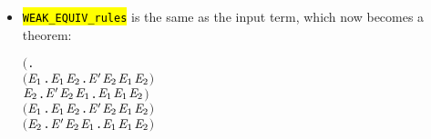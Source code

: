 \begin{itemize}
\item \hl{\texttt{WEAK_EQUIV_rules}} is the same as the input term, which now becomes a theorem:
\begin{alltt}
\HOLTokenTurnstile{} \ensuremath{(}\HOLSymConst{\HOLTokenForall{}}.
        \ensuremath{(}\HOLSymConst{\HOLTokenForall{}}\ensuremath{\HOLBoundVar{E}\sb{\mathrm{1}}}.  \HOLTokenTransBegin{} \HOLTokenTransEnd \ensuremath{\HOLBoundVar{E}\sb{\mathrm{1}}} \HOLSymConst{\HOLTokenImp{}} \HOLSymConst{\HOLTokenExists{}}\ensuremath{\HOLBoundVar{E}\sb{\mathrm{2}}}. \ensuremath{\HOLFreeVar{E}\sp{\prime}} \HOLTokenWeakTransBegin{} \HOLTokenWeakTransEnd \ensuremath{\HOLBoundVar{E}\sb{\mathrm{2}}} \HOLSymConst{\HOLTokenConj{}} \ensuremath{\HOLBoundVar{E}\sb{\mathrm{1}}} \HOLSymConst{\HOLTokenWeakEQ} \ensuremath{\HOLBoundVar{E}\sb{\mathrm{2}}}\ensuremath{)} \HOLSymConst{\HOLTokenConj{}}
        \HOLSymConst{\HOLTokenForall{}}\ensuremath{\HOLBoundVar{E}\sb{\mathrm{2}}}. \ensuremath{\HOLFreeVar{E}\sp{\prime}} \HOLTokenTransBegin{} \HOLTokenTransEnd \ensuremath{\HOLBoundVar{E}\sb{\mathrm{2}}} \HOLSymConst{\HOLTokenImp{}} \HOLSymConst{\HOLTokenExists{}}\ensuremath{\HOLBoundVar{E}\sb{\mathrm{1}}}.  \HOLTokenWeakTransBegin{} \HOLTokenWeakTransEnd \ensuremath{\HOLBoundVar{E}\sb{\mathrm{1}}} \HOLSymConst{\HOLTokenConj{}} \ensuremath{\HOLBoundVar{E}\sb{\mathrm{1}}} \HOLSymConst{\HOLTokenWeakEQ} \ensuremath{\HOLBoundVar{E}\sb{\mathrm{2}}}\ensuremath{)} \HOLSymConst{\HOLTokenConj{}}
   \ensuremath{(}\HOLSymConst{\HOLTokenForall{}}\ensuremath{\HOLBoundVar{E}\sb{\mathrm{1}}}.  \HOLTokenTransBegin\HOLSymConst{\ensuremath{\tau}}\HOLTokenTransEnd \ensuremath{\HOLBoundVar{E}\sb{\mathrm{1}}} \HOLSymConst{\HOLTokenImp{}} \HOLSymConst{\HOLTokenExists{}}\ensuremath{\HOLBoundVar{E}\sb{\mathrm{2}}}. \ensuremath{\HOLFreeVar{E}\sp{\prime}} \HOLSymConst{\HOLTokenEPS} \ensuremath{\HOLBoundVar{E}\sb{\mathrm{2}}} \HOLSymConst{\HOLTokenConj{}} \ensuremath{\HOLBoundVar{E}\sb{\mathrm{1}}} \HOLSymConst{\HOLTokenWeakEQ} \ensuremath{\HOLBoundVar{E}\sb{\mathrm{2}}}\ensuremath{)} \HOLSymConst{\HOLTokenConj{}}
   \ensuremath{(}\HOLSymConst{\HOLTokenForall{}}\ensuremath{\HOLBoundVar{E}\sb{\mathrm{2}}}. \ensuremath{\HOLFreeVar{E}\sp{\prime}} \HOLTokenTransBegin\HOLSymConst{\ensuremath{\tau}}\HOLTokenTransEnd \ensuremath{\HOLBoundVar{E}\sb{\mathrm{2}}} \HOLSymConst{\HOLTokenImp{}} \HOLSymConst{\HOLTokenExists{}}\ensuremath{\HOLBoundVar{E}\sb{\mathrm{1}}}.  \HOLSymConst{\HOLTokenEPS} \ensuremath{\HOLBoundVar{E}\sb{\mathrm{1}}} \HOLSymConst{\HOLTokenConj{}} \ensuremath{\HOLBoundVar{E}\sb{\mathrm{1}}} \HOLSymConst{\HOLTokenWeakEQ} \ensuremath{\HOLBoundVar{E}\sb{\mathrm{2}}}\ensuremath{)} \HOLSymConst{\HOLTokenImp{}}

\end{alltt}
\end{itemize}
